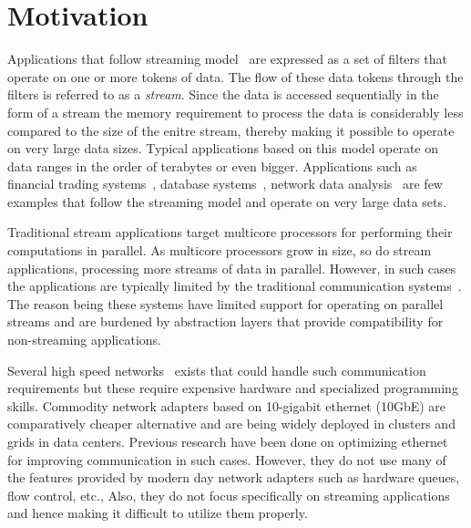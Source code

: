 \documentclass[10pt, conference, compsocconf, reqno]{IEEEtran}
\begin{document}


%
\IEEEpeerreviewmaketitle
\section{Motivation}

Applications that follow streaming model~\cite{Thies:2002:SLS:647478.727935,Halbwachs91thesynchronous,Stephens95asurvey,muthukrishnan2005data} are expressed as a set of filters that operate on one or more tokens of data. The flow of these data tokens through the filters is referred to as a \textit{stream}. Since the data is accessed sequentially in the form of a stream the memory requirement to process the data is considerably less compared to the size of the enitre stream, thereby making it possible to operate on very large data sizes. Typical applications based on this model operate on data ranges in the order of terabytes or even bigger. Applications such as financial trading systems~\cite{agarwal2009faster}, database systems~\cite{Golab03datastream}, network data analysis~\cite{Gilbert01quicksand:quick,Sullivan:1998:TSM:1268256.1268258} are few examples that follow the streaming model and operate on very large data sets.

Traditional stream applications target multicore processors for performing their computations in parallel. As multicore processors grow in size, so do stream applications, processing more streams of data in parallel. However, in such cases the applications are typically limited by the traditional communication systems~\cite{Wu:2007:PPB:1323954.1323957,Wu:2007:PAL:1227865.1228021,Dobrescu09routebricks:exploiting,Han:2010:PGS:1851275.1851207,Kohler2000}. The reason being these systems have limited support for operating on parallel streams and are burdened by abstraction layers that provide compatibility for non-streaming applications.

Several high speed networks~\cite{fredj2011survey} exists that could handle such communication requirements but these require expensive hardware and specialized programming skills. Commodity network adapters based on 10-gigabit ethernet (10GbE) are comparatively cheaper alternative and are being widely deployed in clusters and grids in data centers. Previous research\cite{Romanow03anoverview,Feng:2003:OEN:1048935.1050200} have been done on optimizing ethernet for improving communication in such cases. However, they do not use many of the features provided by modern day network adapters such as hardware queues, flow control, etc., Also, they do not focus specifically on streaming applications and hence making it difficult to utilize them properly.
\end{document}
